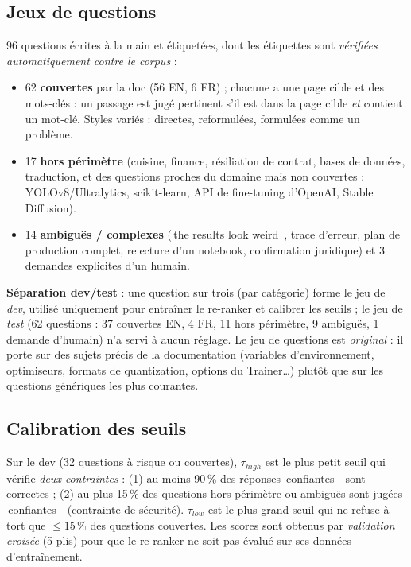 \documentclass[11pt,a4paper]{article}
\providecommand{\og}{\guillemotleft\,}\providecommand{\fg}{\,\guillemotright}
\begin{document}
\subsection{Jeux de questions}
96 questions \'ecrites \`a la main et \'etiquet\'ees, dont les \'etiquettes sont \emph{v\'erifi\'ees automatiquement contre le corpus} :
\begin{itemize}[leftmargin=*,itemsep=1pt]
\item 62 \textbf{couvertes} par la doc (56 EN, 6 FR) ; chacune a une page cible et des mots-cl\'es : un passage est jug\'e pertinent s'il est dans la page cible \emph{et} contient un mot-cl\'e. Styles vari\'es : directes, reformul\'ees, formul\'ees comme un probl\`eme.
\item 17 \textbf{hors p\'erim\`etre} (cuisine, finance, r\'esiliation de contrat, bases de donn\'ees, traduction, et des questions proches du domaine mais non couvertes : YOLOv8/Ultralytics, scikit-learn, API de fine-tuning d'OpenAI, Stable Diffusion).
\item 14 \textbf{ambigu\"es / complexes} (\og the results look weird \fg, trace d'erreur, plan de production complet, relecture d'un notebook, confirmation juridique) et 3 demandes explicites d'un humain.
\end{itemize}
\textbf{S\'eparation dev/test} : une question sur trois (par cat\'egorie) forme le jeu de \emph{dev}, utilis\'e uniquement pour entra\^iner le re-ranker et calibrer les seuils ; le jeu de \emph{test} (62 questions : 37 couvertes EN, 4 FR, 11 hors p\'erim\`etre, 9 ambigu\"es, 1 demande d'humain) n'a servi \`a aucun r\'eglage. Le jeu de questions est \emph{original} : il porte sur des sujets pr\'ecis de la documentation (variables d'environnement, optimiseurs, formats de quantization, options du Trainer\ldots) plut\^ot que sur les questions g\'en\'eriques les plus courantes.
\subsection{Calibration des seuils}\label{sec:calib}
Sur le dev (32 questions \`a risque ou couvertes), $\tau_{high}$ est le plus petit seuil qui v\'erifie \emph{deux contraintes} : (1) au moins 90\,\% des r\'eponses \og confiantes \fg\ sont correctes ; (2) au plus 15\,\% des questions hors p\'erim\`etre ou ambigu\"es sont jug\'ees \og confiantes \fg\ (contrainte de s\'ecurit\'e). $\tau_{low}$ est le plus grand seuil qui ne refuse \`a tort que $\leq 15$\,\% des questions couvertes. Les scores sont obtenus par \emph{validation crois\'ee} (5 plis) pour que le re-ranker ne soit pas \'evalu\'e sur ses donn\'ees d'entra\^inement.
\end{document}
